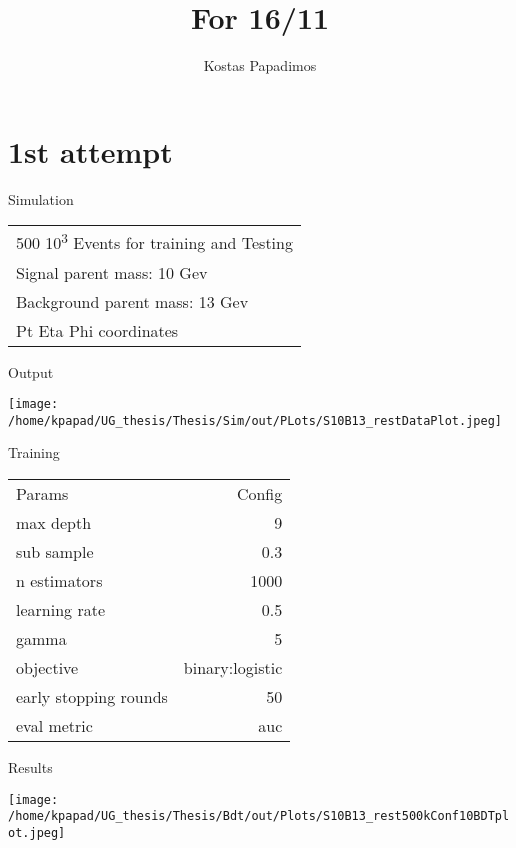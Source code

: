 \documentclass[bigger]{beamer}
\author{Kostas Papadimos}
\date{}
\title{For 16/11}
\begin{document}
\maketitle

\section{1st attempt}
\label{sec:org81ed697}
\begin{frame}[label={sec:org8cdec61}]{Simulation}
\begin{center}
\begin{tabular}{l}
500 \texttimes{} 10\textsuperscript{3} Events for training and Testing\\
Signal parent mass: 10 Gev\\
Background parent mass: 13 Gev\\
Pt Eta Phi coordinates\\
\end{tabular}
\end{center}
\end{frame}

\begin{frame}[label={sec:orgb45f5fe}]{Output}
\begin{center}
\texttt{[image: /home/kpapad/UG\_thesis/Thesis/Sim/out/PLots/S10B13\_restDataPlot.jpeg]}
\end{center}
\end{frame}

\begin{frame}[label={sec:org2190c31}]{Training}
\begin{center}
\begin{tabular}{lr}
\alert{Params} & \alert{Config}\\
max depth & 9\\
sub sample & 0.3\\
n estimators & 1000\\
learning rate & 0.5\\
gamma & 5\\
objective & binary:logistic\\
early stopping rounds & 50\\
eval metric & auc\\
\end{tabular}
\end{center}
\end{frame}

\begin{frame}[label={sec:org8982681}]{Results}
\begin{center}
\texttt{[image: /home/kpapad/UG\_thesis/Thesis/Bdt/out/Plots/S10B13\_rest500kConf10BDTplot.jpeg]}
\end{center}
\end{frame}
\end{document}
